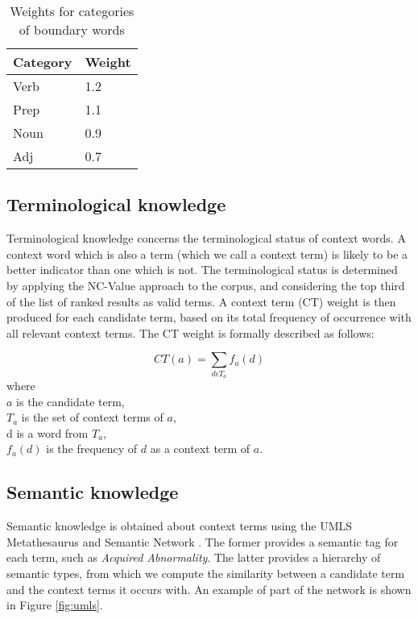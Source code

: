 \begin{table}
\begin{center}
\begin{tabular}{|l|l|}
\hline
Category & Weight\\
\hline
Verb & 1.2\\
Prep & 1.1\\
Noun & 0.9\\
Adj  & 0.7\\
\hline
\end{tabular}
\end{center}               
\caption{Weights for categories of boundary words}
\label{table:synweights}
\end{table}

\subsection{Terminological knowledge}
Terminological knowledge concerns the terminological status of
context words. A context word which is also a term (which we call a
context term) is likely to be a better indicator than one which is
not. The terminological status is determined by applying the NC-Value
approach to the corpus, and considering the top third of the list of ranked
results as valid terms. A context term (CT) weight is then produced for
each candidate term, based on its total frequency of occurrence with
all relevant context terms. The CT weight is formally described as follows:

\begin{equation}\label{CT}
CT(a) = \sum_{d \epsilon T_a} f_a(d)
\end{equation}
where\\ 
\(a\) is the candidate term,\\
\(T_a \) is the set of context terms of \(a\),\\
d is a word from \(T_a\),\\
\(f_a(d)\) is the frequency of \(d\) as a context term of \(a\).

\subsection{Semantic knowledge}
Semantic knowledge is obtained about context terms using
the UMLS Metathesaurus and Semantic Network \cite{UMLS97}. The former
provides a semantic tag for each term, such as {\it Acquired
Abnormality}. The latter provides a hierarchy of semantic types, from
which we compute the similarity between a candidate term and the
context terms it occurs with. An example of part of the network is
shown in Figure \ref{fig:umls}.


